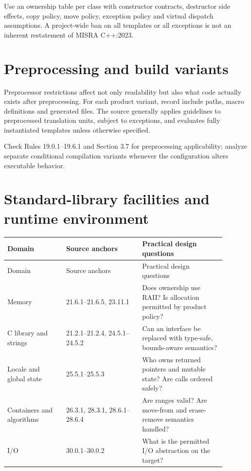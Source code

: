 \documentclass[10pt,letterpaper]{article}
\begin{document}
Use an ownership table per class with constructor contracts, destructor side effects, copy policy, move policy, exception policy and virtual dispatch assumptions. A project-wide ban on all templates or all exceptions is not an inherent restatement of MISRA C++:2023.


\section{Preprocessing and build variants}
Preprocessor restrictions affect not only readability but also what code actually exists after preprocessing. For each product variant, record include paths, macro definitions and generated files. The source generally applies guidelines to preprocessed translation units, subject to exceptions, and evaluates fully instantiated templates unless otherwise specified.

Check Rules 19.0.1--19.6.1 and Section 3.7 for preprocessing applicability; analyze separate conditional compilation variants whenever the configuration alters executable behavior.


\section{Standard-library facilities and runtime environment}
\small\setlength{\tabcolsep}{3pt}\renewcommand{\arraystretch}{1.15}
\begin{longtable}{p{0.24\linewidth}p{0.31\linewidth}p{0.34\linewidth}}
\toprule
Domain & Source anchors & Practical design questions\\ \midrule
\endfirsthead
\toprule
Domain & Source anchors & Practical design questions\\ \midrule
\endhead
Memory & 21.6.1--21.6.5, 23.11.1 & Does ownership use RAII? Is allocation permitted by product policy?\\
C library and strings & 21.2.1--21.2.4, 24.5.1--24.5.2 & Can an interface be replaced with type-safe, bounds-aware semantics?\\
Locale and global state & 25.5.1--25.5.3 & Who owns returned pointers and mutable state? Are calls ordered safely?\\
Containers and algorithms & 26.3.1, 28.3.1, 28.6.1--28.6.4 & Are ranges valid? Are move-from and erase-remove semantics handled?\\
I/O & 30.0.1--30.0.2 & What is the permitted I/O abstraction on the target?\\
\bottomrule
\end{longtable}
\normalsize
\end{document}
